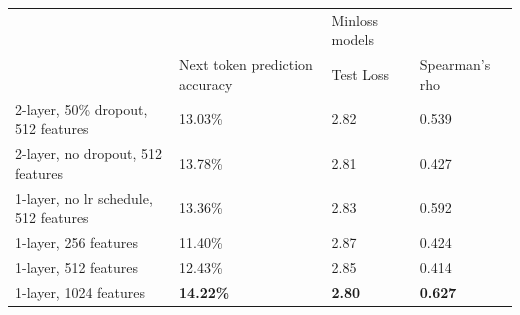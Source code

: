\begin{table}[!ht]
\begin{tabular}{|l|lll|}
\hline
                                      &                                                     & Minloss models                     &                \\ \cline{2-4} 
                                      & \multicolumn{1}{l|}{Next token prediction accuracy} & \multicolumn{1}{l|}{Test Loss}     & Spearman's rho \\ \hline
2-layer, 50\% dropout, 512 features   & \multicolumn{1}{l|}{13.03\%}                        & \multicolumn{1}{l|}{2.82}          & 0.539          \\ \hline
2-layer, no dropout, 512 features     & \multicolumn{1}{l|}{13.78\%}                        & \multicolumn{1}{l|}{2.81}          & 0.427          \\ \hline
1-layer, no lr schedule, 512 features & \multicolumn{1}{l|}{13.36\%}                        & \multicolumn{1}{l|}{2.83}          & 0.592          \\ \hline
1-layer, 256 features                 & \multicolumn{1}{l|}{11.40\%}                        & \multicolumn{1}{l|}{2.87}          & 0.424          \\ \hline
1-layer, 512 features                 & \multicolumn{1}{l|}{12.43\%}                        & \multicolumn{1}{l|}{2.85}          & 0.414          \\ \hline
1-layer, 1024 features                & \multicolumn{1}{l|}{\textbf{14.22\%}}               & \multicolumn{1}{l|}{\textbf{2.80}} & \textbf{0.627} \\ \hline
\end{tabular}
\end{table}